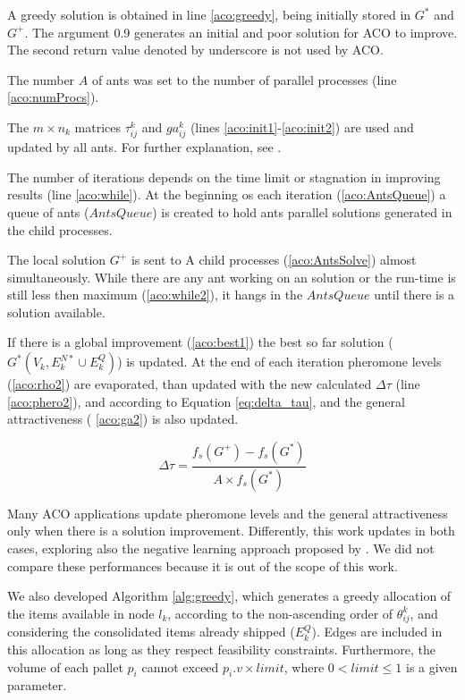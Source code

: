 \documentclass[preprint,authoryear]{elsarticle}
\begin{document}
A greedy solution is obtained in line \ref{aco:greedy}, being initially stored in $G^*$\/ and $G^+$. The argument 0.9 generates an initial and poor solution for ACO to improve. The second return value denoted by underscore is not used by ACO.

The number $A$\/ of ants was set to the number of parallel processes (line \ref{aco:numProcs}).

The $m \times n_k$\/ matrices $\tau^k_{ij}$ and $ga^k_{ij}$\/ (lines \ref{aco:init1}-\ref{aco:init2}) are used and updated by all ants. For further explanation, see \cite{DorigoManiezzoColorni1996}. 

The number of iterations depends on the time limit or stagnation in improving results (line \ref{aco:while}).
At the beginning os each iteration (\ref{aco:AntsQueue}) a queue of ants ($AntsQueue$) is created to hold ants parallel solutions generated in the child processes.

The local solution $G^+$ is sent to A child processes (\ref{aco:AntsSolve}) almost simultaneously.
While there are any ant working on an solution or the run-time is still less then maximum (\ref{aco:while2}), it hangs in the $AntsQueue$ until there is a solution available.

If there is a global improvement (\ref{aco:best1}) the best so far solution ($G^*(V_k, E^{N*}_k \cup E^Q_k)$) is updated.
At the end of each iteration pheromone levels (\ref{aco:rho2}) are evaporated, than updated with the new calculated $\Delta\tau$ (line \ref{aco:phero2}), and according to Equation \ref{eq:delta_tau}, and the general attractiveness ( \ref{aco:ga2}) is also updated.

\begin{equation} \label{eq:delta_tau}
	\Delta\tau = \frac{f_s(G^{+}) - f_s(G^{*})}{A \times f_s(G^{*})}
\end{equation}

Many ACO applications update pheromone levels and the general attractiveness only when there is a solution improvement. Differently, this work updates in both cases, exploring also the negative learning approach proposed by \cite{math9040361}. We did not compare these performances because it is out of the scope of this work.


We also developed Algorithm \ref{alg:greedy}, which generates a greedy allocation of the items available in node $l_k$, according to the non-ascending order of $\theta^k_{ij}$, and considering the consolidated items already shipped ($E^Q_k$). Edges are included in this allocation as long as they respect feasibility constraints. Furthermore, the volume of each pallet $p_i$\/ cannot exceed $p_i.v \times limit$, where $ 0 < limit \leq 1$\/ is a given parameter.
\end{document}
